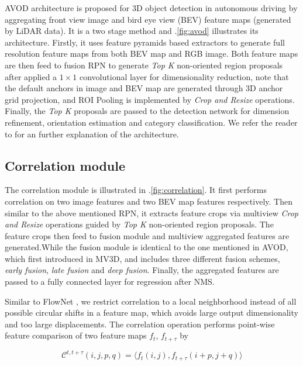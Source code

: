 \documentclass{bmvc2k}
\begin{document}
AVOD architecture is proposed for 3D object detection in autonomous driving by aggregating front view image and bird eye view (BEV) feature maps (generated by LiDAR data). It is a two stage method and \figurename .\ref{fig:avod} illustrates its architecture. Firstly, it uses feature pyramids based extractors to generate full resolution feature maps from both BEV map and RGB image. Both feature maps are then feed to fusion RPN to generate \textit{Top K} non-oriented region proposals after applied a $1 \times 1$ convolutional layer for dimensionality reduction, note that the default anchors in image and BEV map are generated through 3D anchor grid projection, and ROI Pooling is implemented by \textit{Crop and Resize} operations. Finally, the \textit{Top K} proposals are passed to the detection network for dimension refinement, orientation estimation and category classification. We refer
the reader to \cite{ku2018joint} for an further explanation of the architecture.

\subsection{Correlation module}
The correlation module is illustrated in \figurename .\ref{fig:correlation}. It first performs correlation on two image features and two BEV map features respectively. Then similar to the above mentioned RPN, it extracts feature crops via multiview \textit{Crop and Resize} operations guided by \textit{Top K} non-oriented region proposals. The feature crops then feed to fusion module and multiview aggregated features are generated.While the fusion module is identical to the one mentioned in AVOD, which first introduced in MV3D\cite{chen2017multi}, and includes three different fusion schemes, \textit{early fusion}, \textit{late fusion} and \textit{deep fusion}. Finally, the aggregated features are passed to a fully connected layer for regression after NMS.

Similar to FlowNet \cite{dosovitskiy2015flownet}, we restrict correlation to a local neighborhood instead of all possible circular shifts in a feature map, which avoids large output dimensionality and too large displacements. The correlation operation performs point-wise feature comparison of two feature maps $f_t$, $f_{t+\tau}$ by

\begin{equation}
\mathcal{C}^{t, t+\tau}(i, j, p, q) = \Big \langle f_t(i, j), f_{t+\tau} (i+p, j+q) \Big \rangle 
\end{equation}
\end{document}
